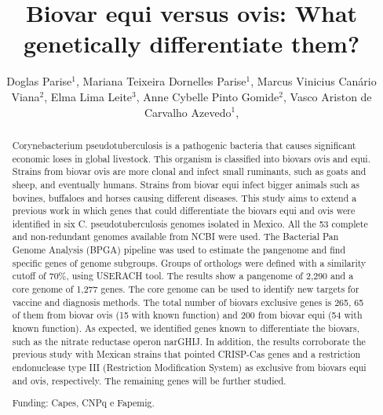 \documentclass[twoside]{article}
\title{\vspace{-15mm}\fontsize{24pt}{10pt}\selectfont\textbf{ Biovar equi versus ovis: What genetically differentiate them? }} %
\author{ Doglas Parise$^{1}$, Mariana Teixeira Dornelles Parise$^{1}$, Marcus Vinicius Canário Viana$^{2}$, Elma Lima Leite$^{3}$, Anne Cybelle Pinto Gomide$^{2}$, Vasco Ariston de Carvalho Azevedo$^{1}$, }
\affil{ 1 Universidade Federal de Minas Gerais

2 Federal University of Minas Gerais

3 UFMG

 }
\date{}
\begin{document}
  
  
  \maketitle %
  
  
  \thispagestyle{fancy} %
  
  
  \begin{abstract}
  Corynebacterium pseudotuberculosis is a pathogenic bacteria that causes significant economic loses in global livestock. This organism is classified into biovars ovis and equi. Strains from biovar ovis are more clonal and infect small ruminants, such as goats and sheep, and eventually humans. Strains from biovar equi infect bigger animals such as bovines, buffaloes and horses causing different diseases. This study aims to extend a previous work in which genes that could differentiate the biovars equi and ovis were identified in six C. pseudotuberculosis genomes isolated in Mexico. All the 53 complete and non-redundant genomes available from NCBI were used. The Bacterial Pan Genome Analysis (BPGA) pipeline was used to estimate the pangenome and find specific genes of genome subgroups. Groups of orthologs were defined with a similarity cutoff of 70\%, using USERACH tool. The results show a pangenome of 2,290 and a core genome of 1,277 genes. The core genome can be used to identify new targets for vaccine and diagnosis methods. The total number of biovars exclusive genes is 265, 65 of them from biovar ovis (15 with known function) and 200 from biovar equi (54 with known function). As expected, we identified genes known to differentiate the biovars, such as the nitrate reductase operon narGHIJ. In addition, the results corroborate the previous study with Mexican strains that pointed CRISP-Cas genes and a restriction endonuclease type III (Restriction Modification System) as exclusive from biovars equi and ovis, respectively. The remaining genes will be further studied.
  
  Funding: Capes, CNPq e Fapemig. \\ 
  \end{abstract}
  
\end{document}
